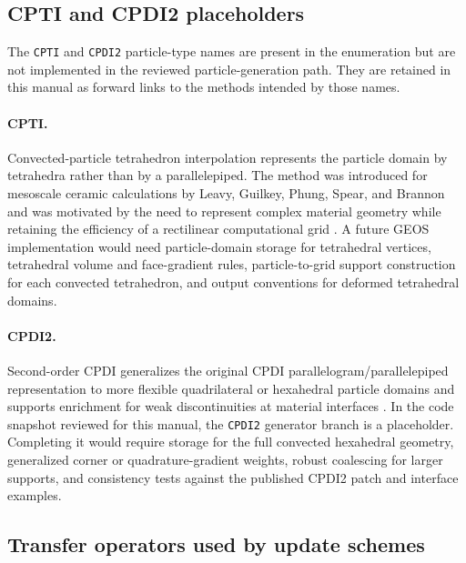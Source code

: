 \subsection{CPTI and CPDI2 placeholders}
\label{subsec:cpti-cpdi2-placeholders}

The \texttt{CPTI} and \texttt{CPDI2} particle-type names are present in the enumeration but are not implemented in the reviewed particle-generation path.  They are retained in this manual as forward links to the methods intended by those names.

\paragraph{CPTI.}
Convected-particle tetrahedron interpolation represents the particle domain by tetrahedra rather than by a parallelepiped.  The method was introduced for mesoscale ceramic calculations by Leavy, Guilkey, Phung, Spear, and Brannon and was motivated by the need to represent complex material geometry while retaining the efficiency of a rectilinear computational grid \cite{leavy2019cpti}.  A future GEOS implementation would need particle-domain storage for tetrahedral vertices, tetrahedral volume and face-gradient rules, particle-to-grid support construction for each convected tetrahedron, and output conventions for deformed tetrahedral domains.

\paragraph{CPDI2.}
Second-order CPDI generalizes the original CPDI parallelogram/parallelepiped representation to more flexible quadrilateral or hexahedral particle domains and supports enrichment for weak discontinuities at material interfaces \cite{sadeghirad2013cpdi2}.  In the code snapshot reviewed for this manual, the \texttt{CPDI2} generator branch is a placeholder.  Completing it would require storage for the full convected hexahedral geometry, generalized corner or quadrature-gradient weights, robust coalescing for larger supports, and consistency tests against the published CPDI2 patch and interface examples.

\subsection{Transfer operators used by update schemes}
\label{subsec:update-transfer-operators}

